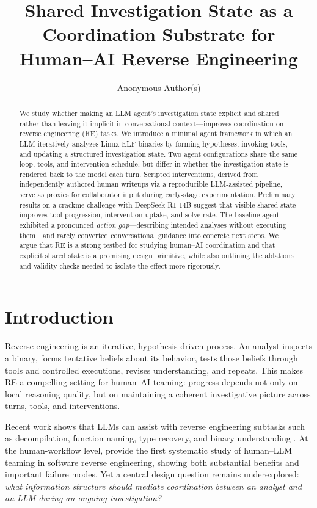 \documentclass[letterpaper]{article}
\title{Shared Investigation State as a Coordination Substrate for Human--AI Reverse Engineering}
\author{
    Anonymous Author(s)
}
\begin{document}
\maketitle

\begin{abstract}
We study whether making an LLM agent's investigation state explicit and shared---rather than leaving it implicit in conversational context---improves coordination on reverse engineering (RE) tasks.
We introduce a minimal agent framework in which an LLM iteratively analyzes Linux ELF binaries by forming hypotheses, invoking tools, and updating a structured investigation state.
Two agent configurations share the same loop, tools, and intervention schedule, but differ in whether the investigation state is rendered back to the model each turn.
Scripted interventions, derived from independently authored human writeups via a reproducible LLM-assisted pipeline, serve as proxies for collaborator input during early-stage experimentation.
Preliminary results on a crackme challenge with DeepSeek R1 14B suggest that visible shared state improves tool progression, intervention uptake, and solve rate.
The baseline agent exhibited a pronounced \emph{action gap}---describing intended analyses without executing them---and rarely converted conversational guidance into concrete next steps.
We argue that RE is a strong testbed for studying human--AI coordination and that explicit shared state is a promising design primitive, while also outlining the ablations and validity checks needed to isolate the effect more rigorously.
\end{abstract}

\section{Introduction}

Reverse engineering is an iterative, hypothesis-driven process.
An analyst inspects a binary, forms tentative beliefs about its behavior, tests those beliefs through tools and controlled executions, revises understanding, and repeats.
This makes RE a compelling setting for human--AI teaming: progress depends not only on local reasoning quality, but on maintaining a coherent investigative picture across turns, tools, and interventions.

Recent work shows that LLMs can assist with reverse engineering subtasks such as decompilation, function naming, type recovery, and binary understanding \citep{xu2023lmpa, shang2025binmetric, shang2025binaryunderstanding, chen2025recopilot}.
At the human-workflow level, \citet{basque2026decompiling} provide the first systematic study of human--LLM teaming in software reverse engineering, showing both substantial benefits and important failure modes.
Yet a central design question remains underexplored: \emph{what information structure should mediate coordination between an analyst and an LLM during an ongoing investigation?}
\end{document}

